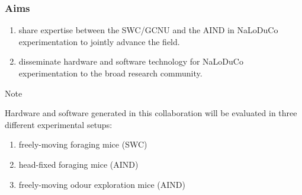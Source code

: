 
\begin{frame}
    \frametitle{Aims}

\begin{enumerate}

    \item share expertise between the SWC/GCNU and the AIND in NaLoDuCo
        experimentation to jointly advance the field.

    \item disseminate hardware and software technology for NaLoDuCo
        experimentation to the broad research community.

\end{enumerate}

    \begin{block}{Note}

        Hardware and software generated in this collaboration will be evaluated
        in three different experimental setups:

        \begin{enumerate}

            \item freely-moving foraging mice (SWC)

            \item head-fixed foraging mice (AIND)

            \item freely-moving odour exploration mice (AIND)

        \end{enumerate}

    \end{block}

\end{frame}

